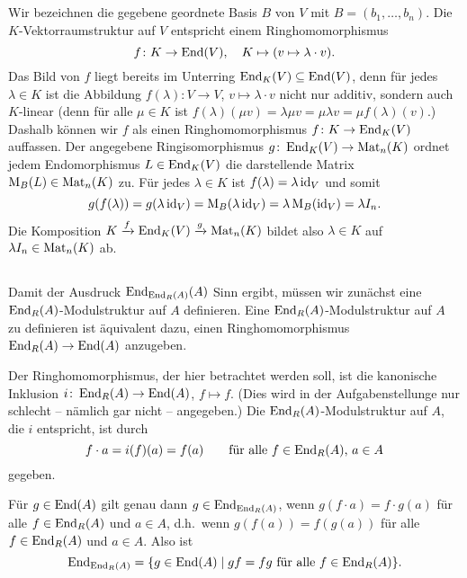 \documentclass[a4paper, 10pt, numbers=noenddot]{scrartcl}
\begin{document}
\subsection{}

Wir bezeichnen die gegebene geordnete Basis $B$ von $V$ mit $B = (b_1, \dotsc, b_n)$.
Die $K$-Vektorraumstruktur auf $V$ entspricht einem Ringhomomorphismus
\[
  f \colon K \to \operatorname{End}(V),
  \quad
  K \mapsto (v \mapsto \lambda \cdot v).
\]
Das Bild von $f$ liegt bereits im Unterring $\operatorname{End}_K(V) \subseteq \operatorname{End}(V)$, denn für jedes $\lambda \in K$ ist die Abbildung $f(\lambda) \colon V \to V$, $v \mapsto \lambda \cdot v$ nicht nur additiv, sondern auch $K$-linear (denn für alle $\mu \in K$ ist $f(\lambda)(\mu v) = \lambda \mu v = \mu \lambda v = \mu f(\lambda)(v)$.)
Dashalb können wir $f$ als einen Ringhomomorphismus $f \colon K \to \operatorname{End}_K(V)$ auffassen.
Der angegebene Ringisomorphismus $g \colon \operatorname{End}_K(V) \to \operatorname{Mat}_n(K)$ ordnet jedem Endomorphismus $L \in \operatorname{End}_K(V)$ die darstellende Matrix $\operatorname{M}_B(L) \in \operatorname{Mat}_n(K)$ zu.
Für jedes $\lambda \in K$ ist $f(\lambda) = \lambda \operatorname{id}_V$ und somit
\[
    g(f(\lambda))
  = g(\lambda \operatorname{id}_V)
  = \operatorname{M}_B(\lambda \operatorname{id}_V)
  = \lambda \operatorname{M}_B(\operatorname{id}_V)
  = \lambda I_n.
\]
Die Komposition $K \xrightarrow{f} \operatorname{End}_K(V) \xrightarrow{g} \operatorname{Mat}_n(K)$ bildet also $\lambda \in K$ auf $\lambda I_n \in \operatorname{Mat}_n(K)$ ab.





\subsection{}

Damit der Ausdruck $\operatorname{End}_{\operatorname{End}_R(A)}(A)$ Sinn ergibt, müssen wir zunächst eine $\operatorname{End}_R(A)$-Mo\-dul\-struk\-tur auf $A$ definieren.
Eine $\operatorname{End}_R(A)$-Modulstruktur auf $A$ zu definieren ist äquivalent dazu, einen Ringhomomorphismus $\operatorname{End}_R(A) \to \operatorname{End}(A)$ anzugeben.

Der Ringhomomorphismus, der hier betrachtet werden soll, ist die kanonische Inklusion $i \colon \operatorname{End}_R(A) \to \operatorname{End}(A)$, $f \mapsto f$.
(Dies wird in der Aufgabenstellunge nur schlecht -- nämlich gar nicht -- angegeben.)
Die $\operatorname{End}_R(A)$-Modulstruktur auf $A$, die $i$ entspricht, ist durch
\[
    f \cdot a
  = i(f)(a)
  = f(a)
  \qquad
  \text{für alle $f \in \operatorname{End}_R(A)$, $a \in A$}
\]
gegeben.

Für $g \in \operatorname{End}(A)$ gilt genau dann $g \in \operatorname{End}_{\operatorname{End}_R(A)}$, wenn $g(f \cdot a) = f \cdot g(a)$ für alle $f \in \operatorname{End}_R(A)$ und $a \in A$, d.h.\ wenn $g(f(a)) = f(g(a))$ für alle $f \in \operatorname{End}_R(A)$ und $a \in A$.
Also ist
\[
    \operatorname{End}_{\operatorname{End}_R(A)}
  = \{ g \in \operatorname{End}(A) \mid \text{$gf = fg$ für alle $f \in \operatorname{End}_R(A)$} \}.
\]
\end{document}
